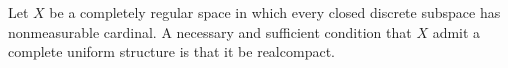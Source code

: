 Let $X$ be a completely regular space in which every closed discrete subspace has nonmeasurable cardinal. A necessary and sufficient condition that $X$ admit a complete uniform structure is that it be realcompact.
